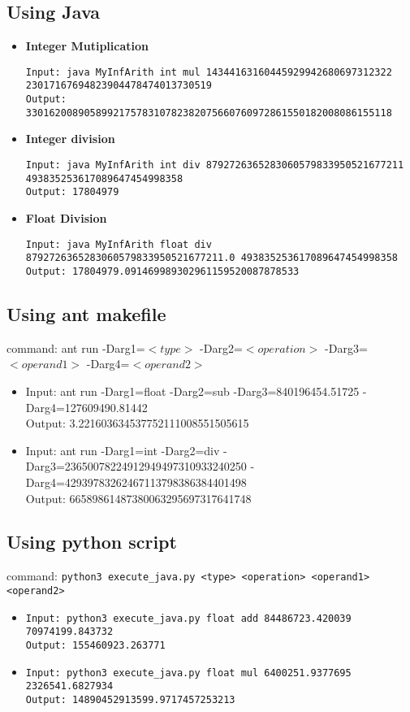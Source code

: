 \documentclass{article}
\begin{document}
\subsection*{Using Java}
    \begin{itemize}
    
    
    \item \textbf{Integer Mutiplication}
    
    \texttt{Input: java MyInfArith int mul 14344163160445929942680697312322 23017167694823904478474013730519} \\
    \texttt{Output: 330162008905899217578310782382075660760972861550182008086155118}

    
    \item \textbf{Integer division}
    
    \texttt{Input: java MyInfArith int div 8792726365283060579833950521677211 493835253617089647454998358} \\
    \texttt{Output: 17804979}

    \item \textbf{Float Division} 
    
    \texttt{Input: java MyInfArith float div 8792726365283060579833950521677211.0 493835253617089647454998358} \\
    \texttt{Output: 17804979.091469989302961159520087878533}
    
    \end{itemize}
\subsection*{Using ant makefile}
command: ant run -Darg1=$<type>$ -Darg2=$<operation>$ -Darg3=$<operand1>$ -Darg4=$<operand2>$
\begin{itemize}
    \item Input: ant run -Darg1=float -Darg2=sub -Darg3=840196454.51725 -Darg4=127609490.81442\\
    Output: 3.221603634537752111008551505615
    \item Input: ant run -Darg1=int -Darg2=div -Darg3=23650078224912949497310933240250 -Darg4=42939783262467113798386384401498\\
    Output: 66589861487380063295697317641748
\end{itemize}


\subsection*{Using python script}
command: \texttt{python3 execute\_java.py <type> <operation> <operand1> <operand2>}
\begin{itemize}
    \item \texttt{Input:  python3 execute\_java.py float add 84486723.420039 70974199.843732}\\
    \texttt{Output: 155460923.263771} \\
    
    \item \texttt{Input:  python3 execute\_java.py float mul 6400251.9377695 2326541.6827934}\\
    \texttt{Output: 14890452913599.9717457253213} \\
\end{itemize}
\end{document}

